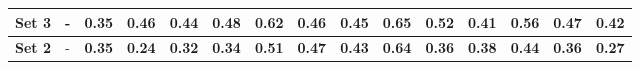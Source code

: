 \begin{table}[!ht]
{\begin{tabular}{|c|c|ccc|ccc|ccc|c|c|c|c|}
		\hline
		
		\textbf{Set 3} & - & \multicolumn{1}{c|}{0.35} & \multicolumn{1}{c|}{0.46} & 0.44 & \multicolumn{1}{c|}{0.48} & \multicolumn{1}{c|}{0.62} & 0.46 & \multicolumn{1}{c|}{0.45} & \multicolumn{1}{c|}{0.65} & 0.52 & 0.41 & 0.56 & 0.47 & 0.42 \\
		
		\hline
		\hline
		
		\textbf{Set 2} & - & \multicolumn{1}{c|}{\textbf{0.35}} & \multicolumn{1}{c|}{\textbf{0.24}} & \textbf{0.32} & \multicolumn{1}{c|}{\textbf{0.34}} & \multicolumn{1}{c|}{\textbf{0.51}} & \textbf{0.47} & \multicolumn{1}{c|}{\textbf{0.43}} & \multicolumn{1}{c|}{\textbf{0.64}} & \textbf{0.36} & \textbf{0.38} & \textbf{0.44} & \textbf{0.36} & \textbf{0.27} \\ 
		
		\hline
					
	\end{tabular}}
	\label{tab:Experiment1.2Results}
\end{table}

